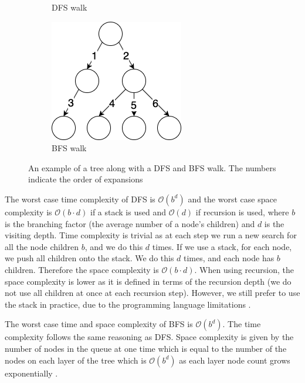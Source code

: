 \begin{figure}[h!]
\begin{subfigure}[b]{0.18\linewidth}
    \caption{DFS walk}
  \end{subfigure}
  \hfill
  \begin{subfigure}[b]{0.18\linewidth}
    \includegraphics[width=\linewidth]{images/bfs.png}
    \caption{BFS walk}
  \end{subfigure}
  \caption{An example of a tree along with a DFS and BFS walk. The numbers indicate the order of expansions}
  \label{fig:trees}
\end{figure}

The worst case time complexity of DFS is $\mathcal{O}(b^d)$ and the worst case space complexity is $\mathcal{O}(b \cdot d)$ if a stack is used and $\mathcal{O}(d)$ if recursion is used, where $b$ is the branching factor (the average number of a node's children) and $d$ is the visiting depth. Time complexity is trivial as at each step we run a new search for all the node children $b$, and we do this $d$ times. If we use a stack, for each node, we push all children onto the stack. We do this $d$ times, and each node has $b$ children. Therefore the space complexity is $\mathcal{O}(b \cdot d)$. When using recursion, the space complexity is lower as it is defined in terms of the recursion depth (we do not use all children at once at each recursion step). However, we still prefer to use the stack in practice, due to the programming language limitations \cite{Cormen:2009:IAT:1614191}.

The worst case time and space complexity of BFS is $\mathcal{O}(b^d)$. The time complexity follows the same reasoning as DFS. Space complexity is given by the number of nodes in the queue at one time which is equal to the number of the nodes on each layer of the tree which is $\mathcal{O}(b^d)$ as each layer node count grows exponentially \cite{Cormen:2009:IAT:1614191}.

